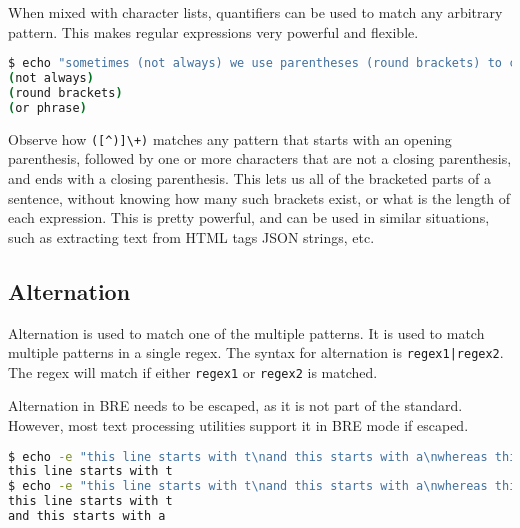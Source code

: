 When mixed with character lists, quantifiers can be used to match any arbitrary pattern. This makes regular expressions very powerful and flexible.

\begin{lstlisting}[language=bash]
$ echo "sometimes (not always) we use parentheses (round brackets) to clarify some part of a sentence (or phrase)." | grep "([^)]\+)" -o
(not always)
(round brackets)
(or phrase)
\end{lstlisting}

Observe how \lstinline|([^)]\+)| matches any pattern that starts with an opening parenthesis, followed by one or more characters that are not a closing parenthesis, and ends with a closing parenthesis. This lets us all of the bracketed parts of a sentence, without knowing how many such brackets exist, or what is the length of each expression. This is pretty powerful, and can be used in similar situations, such as extracting text from HTML tags
JSON strings, etc.

\subsection{Alternation}

Alternation is used to match one of the multiple patterns. It is used to match multiple patterns in a single regex. The syntax for alternation is \lstinline:regex1|regex2:. The regex will match if either \lstinline|regex1| or \lstinline|regex2| is matched.

Alternation in BRE needs to be escaped, as it is not part of the standard. However, most text processing utilities support it in BRE mode if escaped.

\begin{lstlisting}[language=bash]
$ echo -e "this line starts with t\nand this starts with a\nwhereas this line starts with w" | grep '^t'
this line starts with t
$ echo -e "this line starts with t\nand this starts with a\nwhereas this line starts with w" | grep '^t\|^a'
this line starts with t
and this starts with a
\end{lstlisting}

